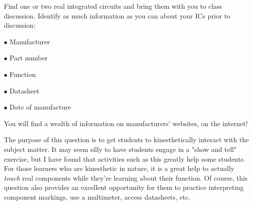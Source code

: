 

Find one or two real integrated circuits and bring them with you to class discussion.  Identify as much information as you can about your ICs prior to discussion:

\medskip
\item{$\bullet$} Manufacturer
\item{$\bullet$} Part number
\item{$\bullet$} Function
\item{$\bullet$} Datasheet
\item{$\bullet$} Date of manufacture
\medskip







You will find a wealth of information on manufacturers' websites, on the internet!







The purpose of this question is to get students to kinesthetically interact with the subject matter.  It may seem silly to have students engage in a "show and tell" exercise, but I have found that activities such as this greatly help some students.  For those learners who are kinesthetic in nature, it is a great help to actually {\it touch} real components while they're learning about their function.  Of course, this question also provides an excellent opportunity for them to practice interpreting component markings, use a multimeter, access datasheets, etc.




